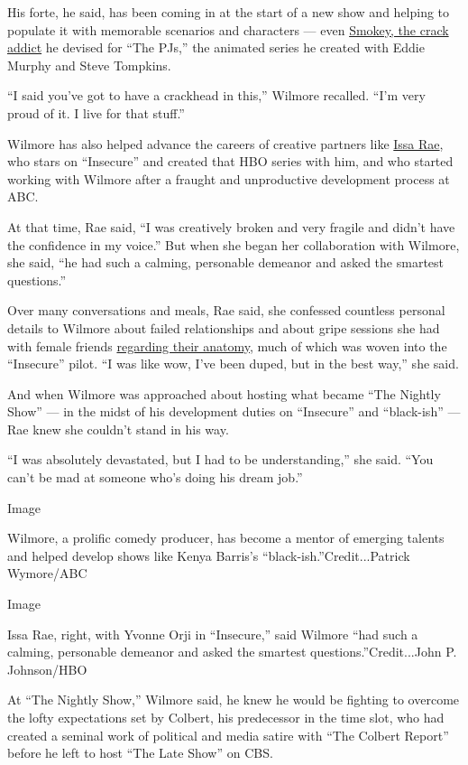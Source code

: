 His forte, he said, has been coming in at the start of a new show and
helping to populate it with memorable scenarios and characters --- even
\href{https://www.youtube.com/watch?v=W6ZBfqkIAAc}{Smokey, the crack
addict} he devised for ``The PJs,'' the animated series he created with
Eddie Murphy and Steve Tompkins.

``I said you've got to have a crackhead in this,'' Wilmore recalled.
``I'm very proud of it. I live for that stuff.''

Wilmore has also helped advance the careers of creative partners like
\href{https://www.nytimes3xbfgragh.onion/2015/08/09/magazine/the-misadventures-of-issa-rae.html?searchResultPosition=6}{Issa
Rae}, who stars on ``Insecure'' and created that HBO series with him,
and who started working with Wilmore after a fraught and unproductive
development process at ABC.

At that time, Rae said, ``I was creatively broken and very fragile and
didn't have the confidence in my voice.'' But when she began her
collaboration with Wilmore, she said, ``he had such a calming,
personable demeanor and asked the smartest questions.''

Over many conversations and meals, Rae said, she confessed countless
personal details to Wilmore about failed relationships and about gripe
sessions she had with female friends
\href{https://www.youtube.com/watch?v=r2DN-eYmRI0}{regarding their
anatomy}, much of which was woven into the ``Insecure'' pilot. ``I was
like wow, I've been duped, but in the best way,'' she said.

And when Wilmore was approached about hosting what became ``The Nightly
Show'' --- in the midst of his development duties on ``Insecure'' and
``black-ish'' --- Rae knew she couldn't stand in his way.

``I was absolutely devastated, but I had to be understanding,'' she
said. ``You can't be mad at someone who's doing his dream job.''

Image

Wilmore, a prolific comedy producer, has become a mentor of emerging
talents and helped develop shows like Kenya Barris's
``black-ish.''Credit...Patrick Wymore/ABC

Image

Issa Rae, right, with Yvonne Orji in ``Insecure,'' said Wilmore ``had
such a calming, personable demeanor and asked the smartest
questions.''Credit...John P. Johnson/HBO

At ``The Nightly Show,'' Wilmore said, he knew he would be fighting to
overcome the lofty expectations set by Colbert, his predecessor in the
time slot, who had created a seminal work of political and media satire
with ``The Colbert Report'' before he left to host ``The Late Show'' on
CBS.

